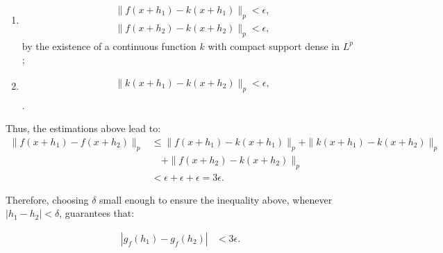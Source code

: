 \documentclass[UTF8,a4paper,10pt]{article}
\begin{document}
\begin{enumerate}
  \item 
  \begin{equation*}
  \begin{aligned}
    &\|f(x+h_1) - k(x+h_1)\|_p < \epsilon, \\
    &\|f(x+h_2) - k(x+h_2)\|_p < \epsilon,
  \end{aligned}
\end{equation*}
by the existence of a continuous function \(k\) with compact support dense in \(L^p\);

\item 
\begin{equation*}
  \begin{aligned}
    &\|k(x+h_1) - k(x+h_2)\|_p < \epsilon, \\
  \end{aligned}
\end{equation*}
.

\end{enumerate} 
  

Thus, the estimations above lead to:
\begin{equation*}
  \begin{aligned}
    \|f(x+h_1) - f(x+h_2)\|_p &\leq \|f(x+h_1) - k(x+h_1)\|_p + \|k(x+h_1) - k(x+h_2)\|_p \\
    &\quad + \|f(x+h_2) - k(x+h_2)\|_p \\
    &< \epsilon + \epsilon + \epsilon = 3\epsilon.
  \end{aligned}
\end{equation*}

Therefore, choosing \(\delta\) small enough to ensure the inequality above, whenever \(|h_1 - h_2| < \delta\), guarantees that:

\begin{equation*}
  \begin{aligned}
    |g_f(h_1) - g_f(h_2)| &< 3\epsilon.
  \end{aligned}
\end{equation*}
\end{document}
